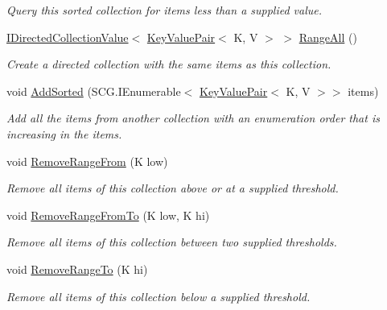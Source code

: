 \begin{DoxyCompactItemize}
\begin{DoxyCompactList}\small\item\em Query this sorted collection for items less than a supplied value. \end{DoxyCompactList}\item 
\hyperlink{interface_c5_1_1_i_directed_collection_value}{I\+Directed\+Collection\+Value}$<$ \hyperlink{struct_c5_1_1_key_value_pair}{Key\+Value\+Pair}$<$ K, V $>$ $>$ \hyperlink{interface_c5_1_1_i_sorted_dictionary_a96e38a0085b3e530c6fdb8b3ffc40848}{Range\+All} ()
\begin{DoxyCompactList}\small\item\em Create a directed collection with the same items as this collection. \end{DoxyCompactList}\item 
void \hyperlink{interface_c5_1_1_i_sorted_dictionary_a21c08676216f78ef7f05b2139e5de3c3}{Add\+Sorted} (S\+C\+G.\+I\+Enumerable$<$ \hyperlink{struct_c5_1_1_key_value_pair}{Key\+Value\+Pair}$<$ K, V $>$$>$ items)
\begin{DoxyCompactList}\small\item\em Add all the items from another collection with an enumeration order that is increasing in the items. \end{DoxyCompactList}\item 
void \hyperlink{interface_c5_1_1_i_sorted_dictionary_ae25a29f876b3f9c64e86325287e8cb9c}{Remove\+Range\+From} (K low)
\begin{DoxyCompactList}\small\item\em Remove all items of this collection above or at a supplied threshold. \end{DoxyCompactList}\item 
void \hyperlink{interface_c5_1_1_i_sorted_dictionary_acc807a1a47949798348593339560c5ed}{Remove\+Range\+From\+To} (K low, K hi)
\begin{DoxyCompactList}\small\item\em Remove all items of this collection between two supplied thresholds. \end{DoxyCompactList}\item 
void \hyperlink{interface_c5_1_1_i_sorted_dictionary_a43cc5a30d8f6f9096311a658be0a833e}{Remove\+Range\+To} (K hi)
\begin{DoxyCompactList}\small\item\em Remove all items of this collection below a supplied threshold. \end{DoxyCompactList}\end{DoxyCompactItemize}
